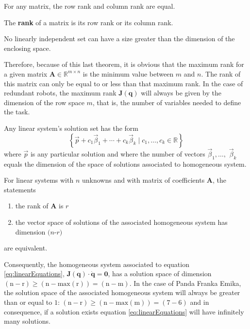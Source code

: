\begin{theorem}
For any matrix, the row rank and column rank are equal.
\end{theorem}

\begin{definition}
The \textbf{rank} of a matrix is its row rank or its column rank.
\end{definition}

\begin{theorem}
No linearly independent set can have a size greater than the dimension of the enclosing space.
\end{theorem}

Therefore, because of this last theorem, it is obvious that the maximum rank for a given matrix $\mathbf{A} \in \mathbb{R}^{m \times n} $ is the minimum value between $m$ and $n$. The rank of this matrix can only be equal to or less than that maximum rank. In the case of redundant robots, the maximum rank ${\mathbf{J}(\mathbf{{q}})}$ will always be given by the dimension of the row space $m$, that is, the number of variables needed to define the task.

\begin{theorem}
    Any linear system's solution set has the form
\[
\left\{\vec{p}+c_{1} \vec{\beta}_{1}+\cdots+c_{k} \vec{\beta}_{k} \mid c_{1}, \ldots, c_{k} \in \mathbb{R}\right\}
\]
where \( \vec{p} \) is any particular solution and where the number of vectors \( \vec{\beta}_{1}, \ldots, \) \( \vec{\beta}_{k} \) equals the dimension of the space of solutions associated to homogeneous system.
\end{theorem}

\begin{theorem}
For linear systems with $n$ unknowns and with matrix of coefficients $\mathbf{A}$, the statements
\begin{enumerate}
    \item the rank of $\mathbf{A}$ is $r$
    \item the vector space of solutions of the associated homogeneous system has dimension $(n$-$r)$
\end{enumerate}
are equivalent.
\end{theorem}


Consequently, the homogeneous system associated to equation \ref{eq:linearEquations}, ${\mathbf{J}(\mathbf{{q}})} \cdot  {\mathbf{\dot{q}}} = {\mathbf{0}}$, has a solution space of dimension $(\text{n} - \text{r}) \geq (\text{n} - \text{max}({\text{r}})) = (\text{n} - \text{m})$. In the case of Panda Franka Emika, the solution space of the associated homogeneous system will always be greater than or equal to $1$: $(\text{n} - \text{r}) \geq (\text{n} - \text{max}(\text{m})) = (7-6)$ and in consequence, if a solution exists equation \ref{eq:linearEquations} will have infinitely many solutions.

